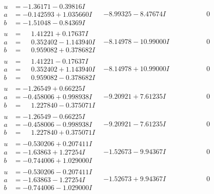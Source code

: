\documentclass[1p]{elsarticle_modified}
\theoremstyle{definition}
\begin{document}
$$\begin{array}{c|c|c}
\begin{aligned}
u &= -1.36171 - 0.39816 I \\
a &= -0.142593 + 1.035660 I \\
b &= -1.51048 - 0.84369 I\end{aligned}
 & -8.99325 - 8.47674 I & \phantom{-0.000000 } 0 \\ \hline\begin{aligned}
u &= \phantom{-}1.41221 + 0.17637 I \\
a &= \phantom{-}0.352402 - 1.143940 I \\
b &= \phantom{-}0.959082 + 0.378682 I\end{aligned}
 & -8.14978 - 10.99000 I & \phantom{-0.000000 } 0 \\ \hline\begin{aligned}
u &= \phantom{-}1.41221 - 0.17637 I \\
a &= \phantom{-}0.352402 + 1.143940 I \\
b &= \phantom{-}0.959082 - 0.378682 I\end{aligned}
 & -8.14978 + 10.99000 I & \phantom{-0.000000 } 0 \\ \hline\begin{aligned}
u &= -1.26549 + 0.66225 I \\
a &= -0.458006 + 0.998938 I \\
b &= \phantom{-}1.227840 - 0.375071 I\end{aligned}
 & -9.20921 + 7.61235 I & \phantom{-0.000000 } 0 \\ \hline\begin{aligned}
u &= -1.26549 - 0.66225 I \\
a &= -0.458006 - 0.998938 I \\
b &= \phantom{-}1.227840 + 0.375071 I\end{aligned}
 & -9.20921 - 7.61235 I & \phantom{-0.000000 } 0 \\ \hline\begin{aligned}
u &= -0.530206 + 0.207411 I \\
a &= -1.63863 + 1.27254 I \\
b &= -0.744006 + 1.029000 I\end{aligned}
 & -1.52673 - 9.94367 I & \phantom{-0.000000 } 0 \\ \hline\begin{aligned}
u &= -0.530206 - 0.207411 I \\
a &= -1.63863 - 1.27254 I \\
b &= -0.744006 - 1.029000 I\end{aligned}
 & -1.52673 + 9.94367 I & \phantom{-0.000000 } 0\\

\end{array}$$
\end{document}
